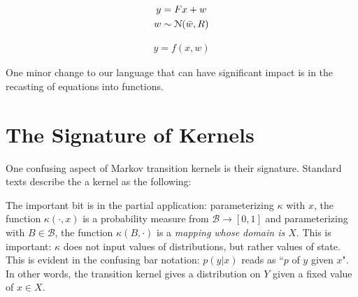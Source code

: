
\begin{equation}
\label{traditional-gaussian-model}
\begin{gathered}
    y = Fx + w \\
    w \sim \mathcal{N}(\bar{w}, R)
\end{gathered}
\end{equation}

\begin{equation}
    \begin{aligned}
	y = f(x,w)
    \end{aligned}
\end{equation}

One minor change to our language that can have significant impact is in the recasting of equations into functions.

\section{The Signature of Kernels}
\label{sec:kernel-signature}

One confusing aspect of Markov transition kernels is their signature. 
Standard texts describe the a kernel as the following:


The important bit is in the partial application: parameterizing $\kappa$ with $x$, the function $\kappa(\cdot, x)$ is a probability measure from $\mathcal{B} \rightarrow [0,1]$ and parameterizing with $B\in \mathcal{B}$, the function $\kappa(B,\cdot)$ is a \emph{mapping whose domain is $X$}.
This is important: $\kappa$ does not input values of distributions, but rather values of state.
This is evident in the confusing bar notation: $p(y|x)$ reads as ``$p$ of $y$ given $x$".
In other words, the transition kernel gives a distribution on $Y$ given a fixed value of $x\in X$.

